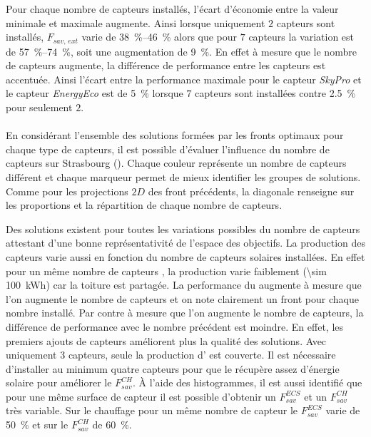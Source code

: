 Pour chaque nombre de capteurs installés, l’écart d’économie entre la valeur minimale et
maximale augmente. Ainsi lorsque uniquement $2$ capteurs sont installés, $F_{sav,\, ext}$
varie de \SIrange{38}{46}{\percent} alors que pour $7$ capteurs la variation est de
\SIrange{57}{74}{\percent}, soit une augmentation de \SI{9}{\percent}. En effet à mesure
que le nombre de capteurs augmente, la différence de performance entre les capteurs est
accentuée. Ainsi l’écart entre la performance maximale pour le capteur \textit{SkyPro} et
le capteur \textit{EnergyEco} est de \SI{5}{\percent} lorsque $7$ capteurs sont installées
contre \SI{2.5}{\percent} pour seulement $2$.


\paragraph{} %
En considérant l’ensemble des solutions formées par les fronts optimaux pour chaque
type de capteurs, il est possible d’évaluer l’influence du nombre de capteurs
sur Strasbourg (). Chaque couleur représente un
nombre de capteurs différent et chaque marqueur permet de mieux identifier les
groupes de solutions. Comme pour les projections $2D$ des front précédents, la diagonale
renseigne sur les proportions et la répartition de chaque nombre de capteurs.

Des solutions existent pour toutes les variations possibles du nombre de capteurs
attestant d’une bonne représentativité de l’espace des objectifs. La production des
capteurs  varie aussi en fonction du nombre de capteurs solaires installées.
En effet pour un même nombre de capteurs , la production
varie faiblement (\SI{\sim 100}{kWh}) car la toiture est partagée. La performance du
 augmente à mesure que l’on augmente le nombre de capteurs et on note clairement
un front pour chaque nombre installé. Par contre à mesure que l’on augmente le nombre de
capteurs, la différence de performance avec le nombre précédent est moindre. En effet, les
premiers ajouts de capteurs améliorent plus la qualité des solutions. Avec uniquement $3$
capteurs, seule la production d’ est couverte. Il est nécessaire d’installer au
minimum quatre capteurs pour que le  récupère assez d’énergie solaire pour améliorer le
$F_{sav}^{CH}$. À l’aide des histogrammes, il est aussi identifié que pour une même
surface de capteur il est possible d’obtenir un $F_{sav}^{ECS}$ et un $F_{sav}^{CH}$ très
variable. Sur le chauffage pour un même nombre de capteur le $F_{sav}^{ECS}$ varie de
\SI{50}{\percent} et sur le $F_{sav}^{CH}$ de \SI{60}{\percent}.

